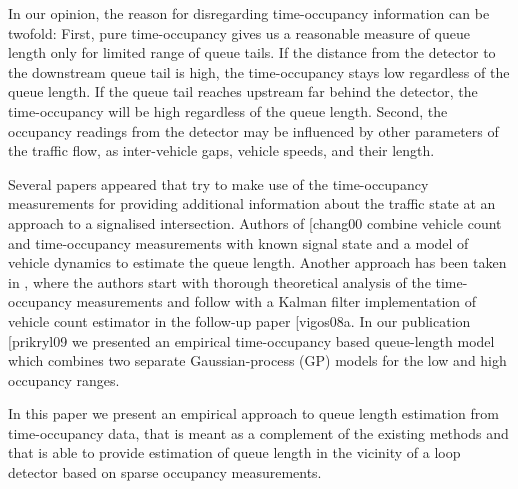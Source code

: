 \documentclass[twoside]{nnw}
\makeatletter
\def\citep{\@ifnextchar[{\@with}{\@without}}
\def\citet{\@ifnextchar[{\@with}{\@without}}
\def\@with[#1]#2{\cite[#1]{#2}}
\def\@without#1{\cite{#1}}
\makeatother
\begin{document}
In our opinion, the reason for disregarding time-occupancy information can be twofold: First, pure time-occupancy gives us a reasonable measure of queue length only for limited range of queue tails. If the distance from the detector to the downstream queue tail is high, the
time-occupancy stays low regardless of the queue length. If the queue tail reaches upstream far behind the detector, the time-occupancy will be high regardless of the queue length. Second,
the occupancy readings from the detector may be influenced by other parameters of the traffic flow, as inter-vehicle gaps, vehicle speeds, and their length.

Several papers appeared that try to make use of the time-occupancy measurements for providing additional information about the traffic state at an approach to a signalised intersection.
Authors of \citet{chang00} combine vehicle count and time-occupancy measurements with known signal state and a model of vehicle dynamics to estimate the queue length. Another approach has been taken in \cite{papageorgiou08a}, where the authors start with thorough theoretical analysis of the time-occupancy measurements and follow with a Kalman filter implementation of vehicle count estimator in the follow-up paper \citep{vigos08a}. In our publication \citep{prikryl09} we presented an empirical time-occupancy based queue-length model which combines two separate Gaussian-process (GP) models for the low and high occupancy ranges.

In this paper we present an empirical approach to queue length estimation from time-occupancy data, that is meant as a complement of the existing methods and that is able to provide estimation of queue length in the vicinity of a loop detector based on sparse occupancy measurements.

\printbibliography
\end{document}
